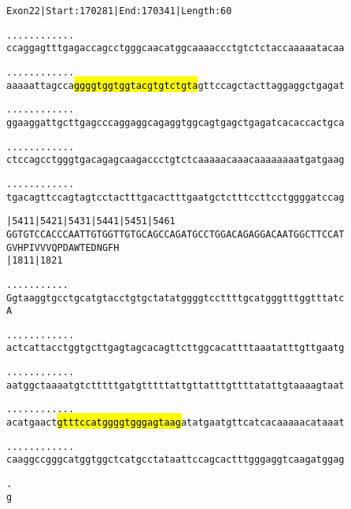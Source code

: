 \documentclass{article}
\begin{document}
\begin{alltt}
Exon 22 | Start: 170281 | End: 170341 | Length: 60

.    .    .    .    .    .    .    .    .    .    .    .    
ccaggagtttgagaccagcctgggcaacatggcaaaaccctgtctctaccaaaaatacaa

.    .    .    .    .    .    .    .    .    .    .    .    
aaaaattagcca\hl{ggggtggtggtacgtgtctgta}gttccagctacttaggaggctgagat

.    .    .    .    .    .    .    .    .    .    .    .    
ggaaggattgcttgagcccaggaggcagaggtggcagtgagctgagatcacaccactgca

.    .    .    .    .    .    .    .    .    .    .    .    
ctccagcctgggtgacagagcaagaccctgtctcaaaaacaaacaaaaaaaatgatgaag

.    .    .    .    .    .    .    .    .    .    .    .    
tgacagttccagtagtcctactttgacactttgaatgctctttccttcctggggatccag

    |5411     |5421     |5431     |5441     |5451     |5461 
GGTGTCCACCCAATTGTGGTTGTGCAGCCAGATGCCTGGACAGAGGACAATGGCTTCCAT
G  V  H  P  I  V  V  V  Q  P  D  A  W  T  E  D  N  G  F  H  
                        |1811                         |1821 

     .    .    .    .    .    .    .    .    .    .    .    
Ggtaaggtgcctgcatgtacctgtgctatatggggtccttttgcatgggtttggtttatc
A                                                           

.    .    .    .    .    .    .    .    .    .    .    .    
actcattacctggtgcttgagtagcacagttcttggcacattttaaatatttgttgaatg

.    .    .    .    .    .    .    .    .    .    .    .    
aatggctaaaatgtctttttgatgtttttattgttatttgttttatattgtaaaagtaat

.    .    .    .    .    .    .    .    .    .    .    .    
acatgaact\hl{gtttccatggggtgggagtaag}atatgaatgttcatcacaaaaacataaat

.    .    .    .    .    .    .    .    .    .    .    .    
caaggccgggcatggtggctcatgcctataattccagcactttgggaggtcaagatggag

.
g
\end{alltt}
\newpage
\end{document}
